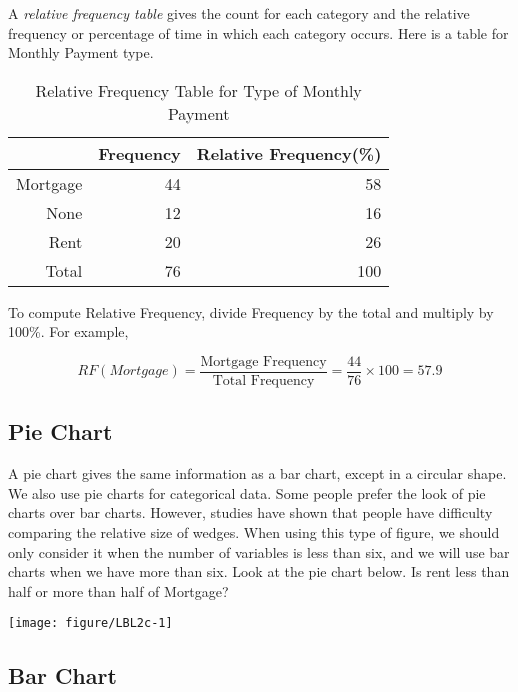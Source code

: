 \documentclass[11pt]{book}\usepackage[]{graphicx}\usepackage[]{color}
\begin{document}
A \textit{relative frequency table} gives the count for each category and the relative frequency or percentage of time in which each category occurs.  Here is a table for Monthly Payment type.

\begin{table}[ht]
\centering
\begin{tabular}{rrr}
  \hline
 & Frequency & Relative Frequency(\%) \\ 
  \hline
Mortgage & 44 & 58 \\ 
  None & 12 & 16 \\ 
  Rent & 20 & 26 \\ 
  Total & 76 & 100 \\ 
   \hline
\end{tabular}
\caption{Relative Frequency Table for Type of Monthly Payment} 
\end{table}


To compute Relative Frequency, divide Frequency by the total and multiply by 100\%.  For example,

\begin{equation*}
RF(Mortgage) = \frac{\text{Mortgage Frequency}}{\text{Total Frequency}} = \frac{44}{76} \times 100 = 57.9
\end{equation*}

\subsection{Pie Chart}

A pie chart gives the same information as a bar chart, except in a circular shape.  We also use pie charts for categorical data. Some people prefer the look of pie charts over bar charts.  However, studies have shown that people have difficulty comparing the relative size of wedges.  When using this type of figure, we should only consider it when the number of variables is less than six, and we will use bar charts when we have more than six.  Look at the pie chart below.  Is rent less than half or more than half of Mortgage?



{\centering \texttt{[image: figure/LBL2c-1]} 

}





\newpage

\subsection{Bar Chart}
\end{document}
